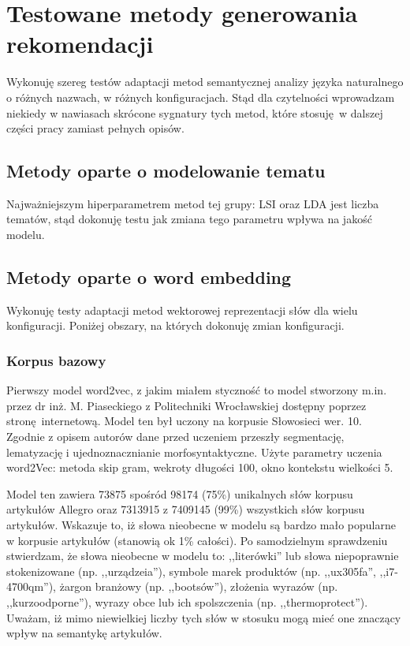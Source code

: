 \documentclass[pl]{minipw} %
\begin{document}
\section{Testowane metody generowania rekomendacji}

Wykonuję szereg testów adaptacji metod semantycznej analizy języka naturalnego o różnych nazwach, w różnych konfiguracjach. Stąd dla czytelności wprowadzam niekiedy w nawiasach skrócone sygnatury tych metod, które stosuję w dalszej części pracy zamiast pełnych opisów.

\subsection{Metody oparte o modelowanie tematu}

Najważniejszym hiperparametrem metod tej grupy: LSI oraz LDA jest liczba tematów, stąd dokonuję testu jak zmiana tego parametru wpływa na jakość modelu.

\subsection{Metody oparte o word embedding}
Wykonuję testy adaptacji metod wektorowej reprezentacji słów dla wielu konfiguracji. Poniżej obszary, na których dokonuję zmian konfiguracji.

\subsubsection{Korpus bazowy}

Pierwszy model word2vec, z jakim miałem styczność to model\cite{pias} stworzony m.in. przez dr inż. M. Piaseckiego z Politechniki Wrocławskiej dostępny poprzez stronę internetową. Model ten był uczony na korpusie Słowosieci wer. 10\cite{wordnet}. Zgodnie z opisem autorów dane przed uczeniem  przeszły segmentację, lematyzację i ujednoznacznianie morfosyntaktyczne. Użyte parametry uczenia word2Vec: metoda skip gram, wekroty długości 100, okno kontekstu wielkości 5.

Model ten zawiera 73875 spośród 98174 (75\%) unikalnych słów korpusu artykułów Allegro oraz 7313915 z 7409145 (99\%) wszystkich słów korpusu artykułów. Wskazuje to, iż słowa nieobecne w modelu są bardzo mało popularne w korpusie artykułów (stanowią ok 1\% całości). Po samodzielnym sprawdzeniu stwierdzam, że słowa nieobecne w modelu to: ,,literówki'' lub słowa niepoprawnie stokenizowane (np. ,,urządzeia''), symbole marek produktów (np. ,,ux305fa'', ,,i7-4700qm''), żargon branżowy (np. ,,bootsów''), złożenia wyrazów (np. ,,kurzoodporne''), wyrazy obce lub ich spolszczenia (np. ,,thermoprotect''). Uważam, iż mimo niewielkiej liczby tych słów w stosuku mogą mieć one znaczący wpływ na semantykę artykułów.
\end{document}
